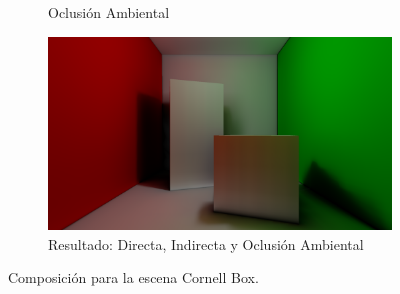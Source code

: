 \begin{figure}[H]
\begin{subfigure}[t]{.49\linewidth}
		\caption*{Oclusión Ambiental}
	\end{subfigure}%
	\hspace{0.01\textwidth}
	\begin{subfigure}[t]{.49\linewidth}
		\centering
		\captionsetup{justification=centering}
		\includegraphics[width=\linewidth]{media/finals/cornell_gi.png}
		\caption*{Resultado: Directa, Indirecta y Oclusión Ambiental}
	\end{subfigure}%
	\caption{Composición para la escena Cornell Box.}
	\label{fig:cornell_final}
\end{figure}
